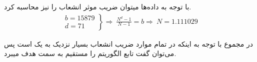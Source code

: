 \documentclass{article}
\begin{document}
با توجه به داده‌ها میتوان ضریب موثر انشعاب را نیز محاسبه کرد.
\begin{align*}
\left.\begin{array}{l}
b = 15879\\
d = 71
\end{array} \right\} \Rightarrow\ \frac{N^d - 1}{N - 1} = b \Rightarrow\ N = 1.111029
\end{align*}

در مجموع با توجه به اینکه در تمام موارد ضریب انشعاب بسیار نزدیک به یک است پس می‌توان گفت تابع الگوریتم را مستقیم به سمت هدف میبرد.
\end{document}
